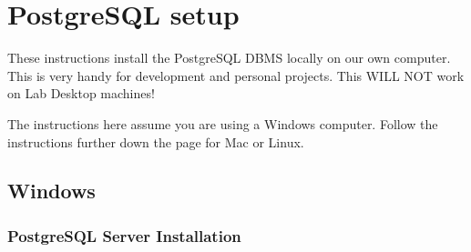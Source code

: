 \chapter{PostgreSQL setup}
\label{ch:postgresql-setup}

These instructions install the PostgreSQL DBMS locally on our own computer.
This is very handy for development and personal projects.
This WILL NOT work on Lab Desktop machines!

The instructions here assume you are using a Windows computer.
Follow the instructions further down the page for Mac or Linux.

\section{Windows}
\label{sec:postgresql-setup-windows}

\subsection{PostgreSQL Server Installation}

